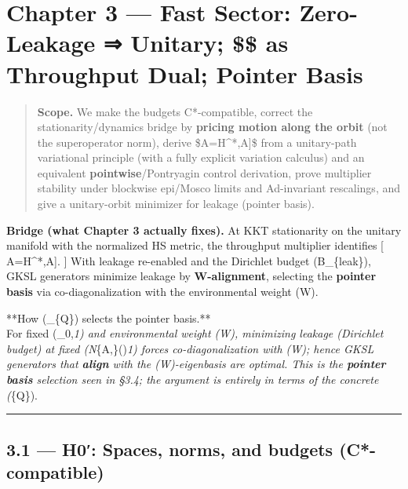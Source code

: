\documentclass[
]{article}
\numberwithin{equation}{section}
\begin{document}
\hypertarget{chapter-3-fast-sector-zero-leakage-unitary-as-throughput-dual-pointer-basis}{%
\section{\texorpdfstring{Chapter 3 --- Fast Sector: Zero-Leakage ⇒
Unitary; \$\hbar\$ as Throughput Dual; Pointer
Basis}{Chapter 3 --- Fast Sector: Zero-Leakage ⇒ Unitary; \$\$ as Throughput Dual; Pointer Basis}}\label{chapter-3-fast-sector-zero-leakage-unitary-as-throughput-dual-pointer-basis}}

\begin{quote}
\textbf{Scope.} We make the budgets C*-compatible, correct the
stationarity/dynamics bridge by \textbf{pricing motion along the orbit}
(not the superoperator norm), derive
\$\dot A=\tfrac{i}{\hbar}{[}H\^{}*,A{]}\$ from a unitary-path
variational principle (with a fully explicit variation calculus) and an
equivalent \textbf{pointwise}/Pontryagin control derivation, prove
multiplier stability under blockwise epi/Mosco limits and Ad-invariant
rescalings, and give a unitary-orbit minimizer for leakage (pointer
basis).
\end{quote}

\textbf{Bridge (what Chapter 3 actually fixes).} At KKT stationarity on
the unitary manifold with the normalized HS metric, the throughput
multiplier identifies {[}
\quad{}\quad \dot A=\tfrac{i}{\hbar}{[}H\^{}*,A{]}.
{]} With leakage re-enabled and the Dirichlet budget (B\_\{\rm leak\}),
GKSL generators minimize leakage by \textbf{W-alignment}, selecting the
\textbf{pointer basis} via co-diagonalization with the environmental
weight (W).

**How (\_\{\rm Q\}) selects the pointer basis.**\\
For fixed (\rho\_0,\rho\emph{1) and environmental weight (W), minimizing
leakage (Dirichlet budget) at fixed
(\textbar{}\mathcal N}\{A,\Phi\}(\Delta)\textbar{}\emph{1) forces
co-diagonalization with (W); hence GKSL generators that \textbf{align}
with the (W)-eigenbasis are optimal. This is the \textbf{pointer basis}
selection seen in §3.4; the argument is entirely in terms of the
concrete (}\{\rm Q\}).

\begin{center}\rule{0.5\linewidth}{0.5pt}\end{center}

\hypertarget{h0-spaces-norms-and-budgets-c-compatible}{%
\subsection{3.1 --- H0′: Spaces, norms, and budgets
(C*-compatible)}\label{h0-spaces-norms-and-budgets-c-compatible}}
\end{document}
